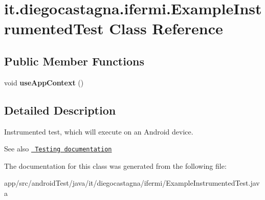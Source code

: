 \hypertarget{classit_1_1diegocastagna_1_1ifermi_1_1_example_instrumented_test}{}\section{it.\+diegocastagna.\+ifermi.\+Example\+Instrumented\+Test Class Reference}
\label{classit_1_1diegocastagna_1_1ifermi_1_1_example_instrumented_test}
\subsection*{Public Member Functions}
\begin{DoxyCompactItemize}
\item 
\mbox{\label{classit_1_1diegocastagna_1_1ifermi_1_1_example_instrumented_test_af37c816ca98dcd0deeedea0391b2f3dd}} 
void {\bfseries use\+App\+Context} ()
\end{DoxyCompactItemize}


\subsection{Detailed Description}
Instrumented test, which will execute on an Android device.

\begin{DoxySeeAlso}{See also}
\href{http://d.android.com/tools/testing}{\texttt{ Testing documentation}} 
\end{DoxySeeAlso}


The documentation for this class was generated from the following file\+:\begin{DoxyCompactItemize}
\item 
app/src/android\+Test/java/it/diegocastagna/ifermi/Example\+Instrumented\+Test.\+java\end{DoxyCompactItemize}
